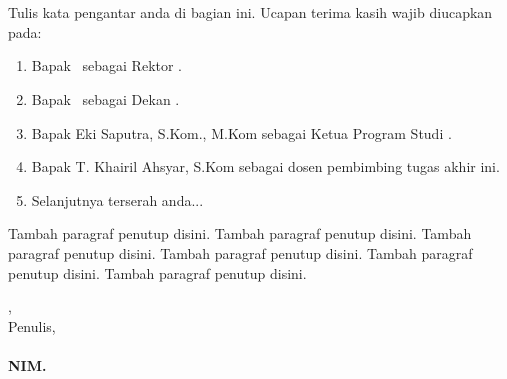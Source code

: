 %
%
%
%

\chapter*{\kataPengantar}
Tulis kata pengantar anda di bagian ini. Ucapan terima kasih wajib diucapkan pada:
\begin{enumerate}
	\item Bapak \rektor\  sebagai Rektor \universitas. 
	\item Bapak \dekan\ sebagai Dekan \fakultas. 
	\item Bapak Eki Saputra, S.Kom., M.Kom sebagai Ketua Program Studi \programStudi.
	\item Bapak T. Khairil Ahsyar, S.Kom sebagai dosen pembimbing tugas akhir ini.
	\item Selanjutnya terserah anda...
\end{enumerate}


Tambah paragraf penutup disini. Tambah paragraf penutup disini. Tambah paragraf penutup disini.
Tambah paragraf penutup disini. Tambah paragraf penutup disini. Tambah paragraf penutup disini.

\vspace*{0.1cm}

\begin{flushright}
\kota, \tanggalPersetujuan\\
Penulis,\\
\vspace{2cm}
\textbf{\underline{\penulis}\\
NIM. \nim}

\end{flushright}
